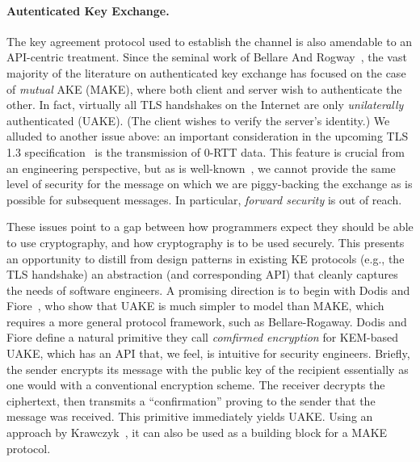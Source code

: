 \paragraph{Autenticated Key Exchange. }
The key agreement protocol used to establish the channel is also amendable to an
API-centric treatment.
%
Since the seminal work of Bellare And Rogway~\cite{BR93}, the vast majority of
the literature on authenticated key exchange has focused on the case of
\emph{mutual} AKE (MAKE), where both client and server wish to authenticate the
other. In fact, virtually all TLS handshakes on the Internet are only
\emph{unilaterally} authenticated (UAKE). (The client wishes to verify the
server's identity.)
%
\fi
%
We alluded to another issue above: an important consideration in the upcoming TLS 1.3
specification~\cite{tls13} is the transmission of 0-RTT data.
%
This feature is crucial from an engineering perspective, but as is
well-known~\cite[Section 2.2]{tls13}, we cannot provide the same level of
security for the message on which we are piggy-backing the exchange as is
possible for subsequent messages. In particular, \emph{forward security} is out
of reach.

These issues point to a gap between how programmers expect they should be able
to use cryptography, and how cryptography is to be used securely. This presents
an opportunity to distill from design patterns in existing KE protocols (e.g.,
the TLS handshake) an abstraction (and corresponding API) that cleanly captures
the needs of software engineers.
%
A promising direction is to begin with Dodis and
Fiore~\cite{dodis2017unilateral}, who show that UAKE is much simpler to model
than MAKE, which requires a more general protocol framework, such as
Bellare-Rogaway.
%
Dodis and Fiore define a natural primitive they call
\emph{comfirmed encryption} for KEM-based UAKE, which has an API that, we
feel, is intuitive for security engineers. Briefly, the sender encrypts its
message with the public key of the recipient essentially as one would with a
conventional encryption scheme. The receiver decrypts the ciphertext, then
transmits a ``confirmation'' proving to the sender that the message was
received.
%
This primitive immediately yields UAKE. Using an approach by
Krawczyk~\cite{krawczyk2016unilateral-to-mutual}, it can also be used as a
building block for a MAKE protocol.

